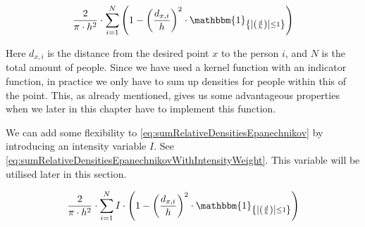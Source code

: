 \begin{equation}
\label{eq:sumRelativeDensitiesEpanechnikov}
\frac{2}{\pi \cdot h^2} \cdot \sum_{i=1}^N \left(1-\left(\frac{d_{x,i}}{h}\right)^2 \cdot \mathbbm{1}_{\left\{\left|\left(\frac{d}{h}\right)\right| \leq 1\right\}}\right)
\end{equation}

Here $d_{x,i}$ is the distance from the desired point $x$ to the person $i$, and $N$ is the total amount of people. Since we have used a kernel function with an indicator function, in practice we only have to sum up densities for people within this of the point. This, as already mentioned, gives us some advantageous properties when we later in this chapter have to implement this function.

We can add some flexibility to \cref{eq:sumRelativeDensitiesEpanechnikov} by introducing an intensity variable $I$. See \cref{eq:sumRelativeDensitiesEpanechnikovWithIntensityWeight}. This variable will be utilised later in this section.

\begin{equation}
\label{eq:sumRelativeDensitiesEpanechnikovWithIntensityWeight}
\frac{2}{\pi \cdot h^2} \cdot \sum_{i=1}^N I \cdot \left(1-\left(\frac{d_{x,i}}{h}\right)^2 \cdot \mathbbm{1}_{\left\{\left|\left(\frac{d}{h}\right)\right| \leq 1\right\}}\right)
\end{equation}



